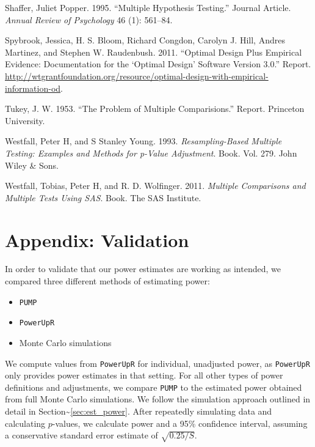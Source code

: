 \documentclass[
]{article}
\providecommand{\tightlist}{%
  \setlength{\itemsep}{0pt}\setlength{\parskip}{0pt}}
\newlength{\cslhangindent}
\newlength{\cslentryspacingunit} %
\newenvironment{CSLReferences}[2] %
 {%
  \setlength{\parindent}{0pt}
  \ifodd #1
  \let\oldpar\par
  \def\par{\hangindent=\cslhangindent\oldpar}
  \fi
  \setlength{\parskip}{#2\cslentryspacingunit}
 }%
 {}
\begin{document}
\begin{CSLReferences}{1}{0}
\leavevmode{}%
Shaffer, Juliet Popper. 1995. {``Multiple Hypothesis Testing.''} Journal
Article. \emph{Annual Review of Psychology} 46 (1): 561--84.

\leavevmode{}%
Spybrook, Jessica, H. S. Bloom, Richard Congdon, Carolyn J. Hill, Andres
Martinez, and Stephen W. Raudenbush. 2011. {``Optimal Design Plus
Empirical Evidence: Documentation for the {`Optimal Design'} Software
Version 3.0.''} Report.
\url{http://wtgrantfoundation.org/resource/optimal-design-with-empirical-information-od}.

\leavevmode{}%
Tukey, J. W. 1953. {``The Problem of Multiple Comparisions.''} Report.
Princeton University.

\leavevmode{}%
Westfall, Peter H, and S Stanley Young. 1993. \emph{Resampling-Based
Multiple Testing: Examples and Methods for p-Value Adjustment}. Book.
Vol. 279. John Wiley \& Sons.

\leavevmode{}%
Westfall, Tobias, Peter H, and R. D. Wolfinger. 2011. \emph{Multiple
Comparisons and Multiple Tests Using SAS}. Book. The SAS Institute.

\end{CSLReferences}

\section{Appendix: Validation}

In order to validate that our power estimates are working as intended,
we compared three different methods of estimating power:

\begin{itemize}
\tightlist
\item
  \texttt{PUMP}
\item
  \texttt{PowerUpR}
\item
  Monte Carlo simulations
\end{itemize}

We compute values from \texttt{PowerUpR} for individual, unadjusted
power, as \texttt{PowerUpR} only provides power estimates in that
setting. For all other types of power definitions and adjustments, we
compare \texttt{PUMP} to the estimated power obtained from full Monte
Carlo simulations. We follow the simulation approach outlined in detail
in Section\textasciitilde{}\ref{sec:est_power}. After repeatedly
simulating data and calculating \(p\)-values, we calculate power and a
95\% confidence interval, assuming a conservative standard error
estimate of \(\sqrt{0.25/S}\).
\end{document}
